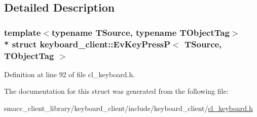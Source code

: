 \subsection{Detailed Description}
\subsubsection*{template$<$typename T\+Source, typename T\+Object\+Tag$>$\\*
struct keyboard\+\_\+client\+::\+Ev\+Key\+Press\+P$<$ T\+Source, T\+Object\+Tag $>$}



Definition at line 92 of file cl\+\_\+keyboard.\+h.



The documentation for this struct was generated from the following file\+:\begin{DoxyCompactItemize}
\item 
smacc\+\_\+client\+\_\+library/keyboard\+\_\+client/include/keyboard\+\_\+client/\hyperlink{cl__keyboard_8h}{cl\+\_\+keyboard.\+h}\end{DoxyCompactItemize}
